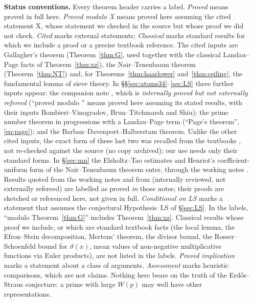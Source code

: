 \documentclass[11pt,reqno]{amsart}
\theoremstyle{definition}
\begin{document}
\smallskip\noindent\textbf{Status conventions.}  Every theorem header
carries a label.  \emph{Proved} means proved in full here.  \emph{Proved
modulo X} means proved here assuming the cited statement X, whose statement
we checked in the source but whose proof we did not check.  \emph{Cited}
marks external statements; \emph{Classical} marks standard results for
which we include a proof or a precise textbook reference.  The cited
inputs are Gallagher's theorem (Theorem~\ref{thm:G}, used together with the
classical Landau--Page facts of Theorem~\ref{thm:xz}), the Nair--Tenenbaum
theorem (Theorem~\ref{thm:NT}) and, for Theorems~\ref{thm:haarlower}
and~\ref{thm:ceiling}, the fundamental lemma of sieve theory.  In
\S\S\ref{sec:atoms34}--\ref{sec:LS} three further inputs appear: the companion
note \cite{TQ}, which is \emph{internally proved but not externally
refereed} (``proved modulo \cite{TQ}'' means proved here assuming its
stated results, with their inputs Bombieri--Vinogradov, Brun--Titchmarsh and
Shiu); the prime number theorem in progressions with a Landau--Page term
(``Page's theorem'', \eqref{eq:page}); and the Barban--Davenport--Halberstam
theorem.  Unlike the other cited inputs, the exact form of these last two
was recalled from the textbooks \cite[Chs.~20, 29]{Dav}, not re-checked
against the source (no copy archived); our use needs only their standard
forms.  In \S\ref{sec:mn} the Elsholtz--Tao estimates \cite{ET} and Henriot's
coefficient-uniform form of the Nair--Tenenbaum theorem \cite[Thm.~5]{Henriot}
enter, through the working notes \cite{MN,MN2}.  Results quoted from the working notes \cite{O15,O16,MN,MN2} and from
\cite{SL} (internally reviewed, not externally refereed) are labelled as
proved \emph{in} those notes; their proofs are sketched or referenced here,
not given in full.  \emph{Conditional on LS} marks a statement that assumes the
conjectural Hypothesis~LS of \S\ref{sec:LS}.  In the labels,
``modulo Theorem~\ref{thm:G}'' includes Theorem~\ref{thm:xz}.  Classical
results whose proof we include, or which are standard textbook facts (the
local lemma, the Efron--Stein decomposition, Mertens' theorem, the divisor
bound, the Rosser--Schoenfeld bound for $\vartheta(x)$, mean values of
non-negative multiplicative functions via Euler products), are not listed
in the labels.  \emph{Proved implication} marks a statement about a class of
arguments.  \emph{Assessment} marks heuristic comparisons, which are not
claims.  Nothing here bears on the truth of the Erd\H{o}s--Straus conjecture:
a prime with large $W(p)$ may well have other representations.
\end{document}
